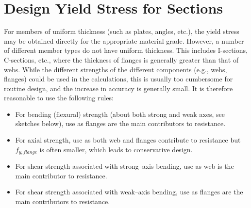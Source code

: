 \section{Design Yield Stress for Sections}\label{sec:ys}
For members of uniform thickness (such as plates, angles, etc.), the yield stress may be obtained directly for the appropriate material grade.
However, a number of different member types do not have uniform thickness.
This includes I-sections, C-sections, etc., where the thickness of flanges is generally greater than that of webs.
While the different strengths of the different components (e.g., webs, flanges) could be used in the calculations, this is usually too cumbersome for routine design, and the increase in accuracy is generally small.
It is therefore reasonable to use the following rules:
\begin{itemize}
\item For bending (flexural) strength (about both strong and weak axes, see sketches below), use  as flanges are the main contributors to resistance.
\begin{figure}[H]
\centering

\end{figure}
\item For axial strength, use  as both web and flanges contribute to resistance but $f_{y,flange}$ is often smaller, which leads to conservative design.
\begin{figure}[H]
\centering

\end{figure}
\item For shear strength associated with strong--axis bending, use  as web is the main contributor to resistance.
\begin{figure}[H]
\centering

\end{figure}
\item For shear strength associated with weak--axis bending, use  as flanges are the main contributors to resistance.
\begin{figure}[H]
\centering

\end{figure}
\end{itemize}
